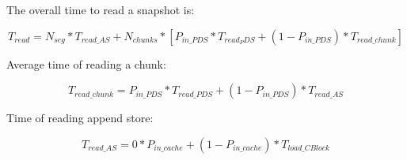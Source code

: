 The overall time to read a snapshot is:

\begin{dmath}
T_{read} = N_{seg} * {T_{read\_AS} + N_{chunks} * [P_{in\_PDS} * T_{read_PDS} + (1 - P_{in\_PDS}) * T_{read\_chunk}]}
\end{dmath}

Average time of reading a chunk:

\begin{dmath}
T_{read\_chunk} = P_{in\_PDS} * T_{read\_PDS} + (1 - P_{in\_PDS}) * T_{read\_AS}
\end{dmath}

Time of reading append store:

\begin{dmath}
T_{read\_AS} = 0 * P_{in\_cache} + (1 - P_{in\_cache} ) * T_{load\_CBlock}
\end{dmath}
